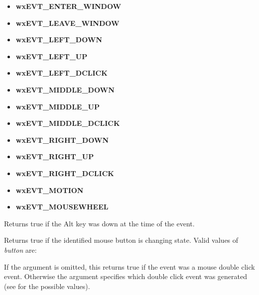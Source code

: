 \begin{itemize}
\itemsep=0pt
\item {\bf wxEVT\_ENTER\_WINDOW}
\item {\bf wxEVT\_LEAVE\_WINDOW}
\item {\bf wxEVT\_LEFT\_DOWN}
\item {\bf wxEVT\_LEFT\_UP}
\item {\bf wxEVT\_LEFT\_DCLICK}
\item {\bf wxEVT\_MIDDLE\_DOWN}
\item {\bf wxEVT\_MIDDLE\_UP}
\item {\bf wxEVT\_MIDDLE\_DCLICK}
\item {\bf wxEVT\_RIGHT\_DOWN}
\item {\bf wxEVT\_RIGHT\_UP}
\item {\bf wxEVT\_RIGHT\_DCLICK}
\item {\bf wxEVT\_MOTION}
\item {\bf wxEVT\_MOUSEWHEEL}
\end{itemize}


\label{wxmouseeventaltdown}


Returns true if the Alt key was down at the time of the event.


\label{wxmouseeventbutton}


Returns true if the identified mouse button is changing state. Valid
values of {\it button} are:

\begin{twocollist}\itemsep=0pt
\end{twocollist}


\label{wxmouseeventbuttondclick}


If the argument is omitted, this returns true if the event was a mouse
double click event. Otherwise the argument specifies which double click event
was generated (see  for the possible
values).


